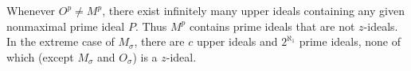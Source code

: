 Whenever $O^p \neq M^p$, there exist infinitely many upper ideals containing any given nonmaximal prime ideal $P$. Thus $M^p$ contains prime ideals that are not $z$-ideals. In the extreme case of $M_\sigma$, there are $c$ upper ideals and $2^{\aleph_1}$ prime ideals, none of which (except $M_\sigma$ and $O_\sigma$) is a $z$-ideal.
